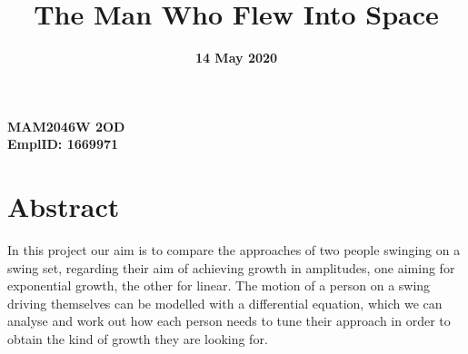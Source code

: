 \documentclass[12pt]{article}
\title{The Man Who Flew Into Space}
\date{\textbf{14 May 2020}}
\author{}
\begin{document}
    \maketitle
    \begin{center}
    \textbf{\large{MAM2046W 2OD}}\\
    \textbf{\large{EmplID: 1669971}}\\
    \end{center}

    \section{Abstract}
    In this project our aim is to compare the approaches of two people swinging on a swing set, regarding 
    their aim of achieving growth in amplitudes, one aiming for exponential growth, the other for 
    linear. The motion of a person on a swing driving themselves can be modelled with a differential 
    equation, which we can analyse and work out how each person needs to tune their approach in order 
    to obtain the kind of growth they are looking for.
\end{document}
